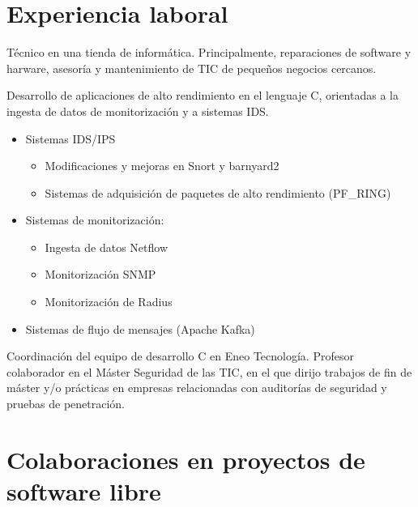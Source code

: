 \documentclass[11pt,a4paper,sans]{moderncv}
\begin{document}
\section{Experiencia laboral}
{Técnico en una tienda de informática. Principalmente, reparaciones de software y harware,
asesoría y mantenimiento de TIC de pequeños negocios cercanos.\newline{}}
{Desarrollo de aplicaciones de alto rendimiento en el lenguaje C, orientadas a la
ingesta de datos de monitorización y a sistemas IDS.\newline
\begin{itemize}%
  \item Sistemas IDS/IPS
  \begin{itemize}
    \item Modificaciones y mejoras en Snort y barnyard2
    \item Sistemas de adquisición de paquetes de alto rendimiento (PF\_RING)
  \end{itemize}
  \item Sistemas de monitorización:
  \begin{itemize}
    \item Ingesta de datos Netflow
    \item Monitorización SNMP
    \item Monitorización de Radius
  \end{itemize}
  \item Sistemas de flujo de mensajes (Apache Kafka)
\end{itemize}}
{Coordinación del equipo de desarrollo C en Eneo Tecnología.}
{Profesor colaborador en el Máster Seguridad de las TIC, en el que dirijo
trabajos de fin de máster y/o prácticas en empresas relacionadas con
auditorías de seguridad y pruebas de penetración.}

\section{Colaboraciones en proyectos de software libre}
\renewcommand{\listitemsymbol}{-~} %
\end{document}
